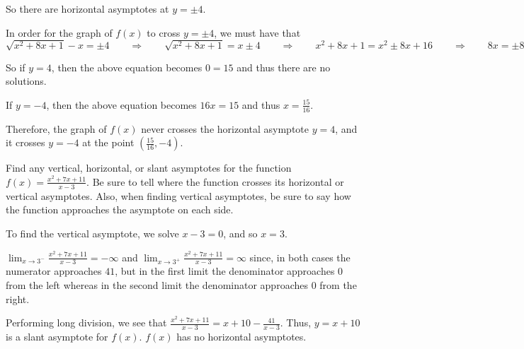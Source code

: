 \documentclass[nooutcomes]{ximera}
\begin{document}
\begin{problem}
\begin{enumerate}
\begin{freeResponse}
		So there are horizontal asymptotes at $y = \pm 4$. 
		
		In order for the graph of $f(x)$ to cross $y = \pm 4$, we must have that 
		$ \sqrt{x^2 + 8x + 1} - x = \pm 4
		\qquad \Longrightarrow \qquad \sqrt{x^2 + 8x + 1} = x \pm 4
		\qquad \Longrightarrow \qquad x^2 + 8x + 1 = x^2 \pm 8x + 16
		\qquad \Longrightarrow \qquad 8x = \pm 8x + 15.$
		
		So if $y = 4$, then the above equation becomes $0 = 15$ and thus there are no solutions.
		
		If $y=-4$, then the above equation becomes $16x = 15$ and thus $x = \frac{15}{16}$.
		
		Therefore, the graph of $f(x)$ never crosses the horizontal asymptote $y = 4$, and it crosses $y = -4$ at the point $\left( \frac{15}{16}, -4 \right)$.  
		
		\end{freeResponse}
	
	\end{enumerate}
	
\end{problem}
			
			
			
			


\begin{problem}	
Find any vertical, horizontal, or slant asymptotes for the function $f(x) = \frac{x^2 + 7x + 11}{x-3}$.  Be sure to tell where the function crosses its horizontal or vertical asymptotes.  Also, when finding vertical asymptotes, be sure to say how the function approaches the asymptote on each side.

		\begin{freeResponse}
		
		To find the vertical asymptote, we solve $x - 3 = 0$, and so $x = 3$.  
		
		$\lim_{x \to 3^-}  \frac{x^2 + 7x + 11}{x-3} = -\infty$ and $\lim_{x \to 3^+}  \frac{x^2 + 7x + 11}{x-3} = \infty$ since, in both cases the numerator approaches $41$, but in the first limit the denominator approaches $0$ from the left whereas in the second limit the denominator approaches $0$ from the right.
		
		  Performing long division, we see that $\frac{x^2 + 7x + 11}{x-3} = x + 10 - \frac{41}{x-3}$.  Thus, $y = x+10$ is a slant asymptote for $f(x)$.  $f(x)$ has no horizontal asymptotes.
		
		\end{freeResponse}
\end{problem}
\end{document}
